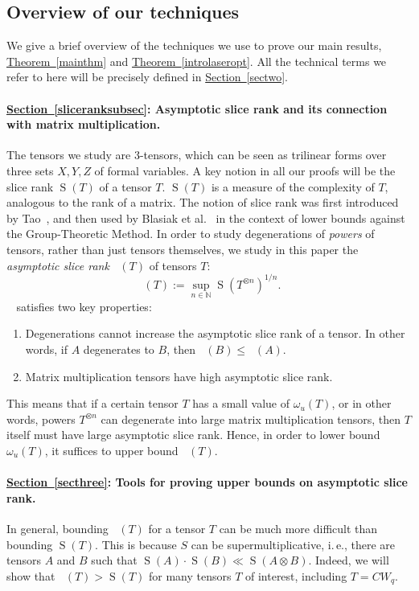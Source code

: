 \documentclass[11pt]{article}
\numberwithin{equation}{section}
\theoremstyle{definition}
\theoremstyle{plain}
\newcommand{\N}{\mathbb N}
\newcommand{\ie}{i.\,e.}
\newcommand{\expref}[2]{\hyperref[#2]{#1~\ref{#2}}}
\newcommand{\sr}{\mathop{\operatorname{S}}}
\newcommand{\tsr}{\mathop{\tilde{\operatorname{S}}}}
\theoremstyle{definition}
\begin{document}
%
\subsection{Overview of our techniques} \label{overviewsec}

We give a brief overview of the techniques we use to prove our main results, \expref{Theorem}{mainthm} and \expref{Theorem}{introlaseropt}. All the technical terms we refer to here will be precisely defined in \expref{Section}{sectwo}.


%
\paragraph{\expref{Section}{sliceranksubsec}: Asymptotic slice rank and its connection with matrix multiplication.} The tensors we study are 3-tensors, which can be seen as trilinear forms over three sets $X,Y,Z$ of formal variables. A key notion in all our proofs will be the slice rank $\sr(T)$ of a tensor $T$. $\sr(T)$ is a measure of the complexity of $T$, analogous to the rank of a matrix. The notion of slice rank was first introduced by Tao~\cite{tao1}, and then used by Blasiak et al.~\cite{blasiak} in the context of lower bounds against the Group-Theoretic Method. In order to study degenerations of \emph{powers} of tensors, rather than just tensors themselves, we study in this paper the \emph{asymptotic slice rank} $\tsr(T)$ of tensors $T$:
$$\tsr(T) := \sup_{n \in\N} \sr(T^{\otimes n})^{1/n}.$$
$\tsr$ satisfies two key properties:
\begin{enumerate}
    \item Degenerations cannot increase the asymptotic slice rank of a tensor. In other words, if $A$ degenerates to $B$, then $\tsr(B) \leq \tsr(A)$.
    \item Matrix multiplication tensors have high asymptotic slice rank.
\end{enumerate}
This means that if a certain tensor $T$ has a small value of $\omega_u(T)$, or in other words, powers $T^{\otimes n}$ can degenerate into large matrix multiplication tensors, then $T$ itself must have large asymptotic slice rank. Hence, in order to lower bound $\omega_u(T)$, it suffices to upper bound $\tsr(T)$.

%
\paragraph{\expref{Section}{secthree}: Tools for proving upper bounds on asymptotic slice rank.} In general, bounding $\tsr(T)$ for a tensor $T$ can be much more difficult than bounding $\sr(T)$. This is because $S$ can be supermultiplicative, \ie, there are tensors $A$ and $B$ such that $\sr(A) \cdot \sr(B) \ll \sr(A \otimes B)$. Indeed, we will show that $\tsr(T) > \sr(T)$ for many tensors $T$ of interest, including $T = CW_q$.
\end{document}
